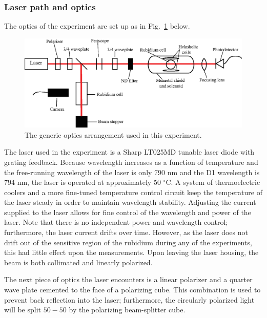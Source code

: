 \subsubsection{Laser path and optics}

The optics of the experiment are set up as in Fig.~\ref{fig:optics1} below.

\begin{figure}[htbp]
\begin{center}
\includegraphics[width=6.5in]{./figures/optics1.eps}
\caption{\small{The generic optics arrangement used in this experiment.}}
\label{fig:optics1}
\end{center}
\end{figure}


The laser used in the experiment is a Sharp LT025MD tunable laser diode with grating feedback. Because wavelength increases as a function of temperature and the free-running wavelength of the laser is only $790$ nm and the D1 wavelength is $794$ nm, the laser is operated at approximately $50$ $^{\circ}$C. A system of thermoelectric coolers and a more fine-tuned temperature control circuit keep the temperature of the laser steady in order to maintain wavelength stability. Adjusting the current supplied to the laser allows for fine control of the wavelength and power of the laser. Note that there is no independent power and wavelength control; furthermore, the laser current drifts over time. However, as the laser does not drift out of the sensitive region of the rubidium during any of the experiments, this had little effect upon the measurements. Upon leaving the laser housing, the beam is both collimated and linearly polarized.

The next piece of optics the laser encounters is a linear polarizer and a quarter wave plate cemented to the face of a polarizing cube. This combination is used to prevent back reflection into the laser; furthermore, the circularly polarized light will be split $50-50$ by the polarizing beam-splitter cube. 

